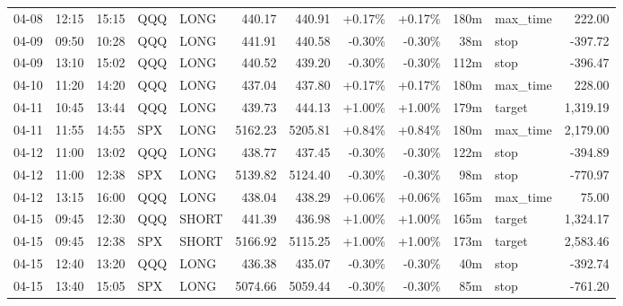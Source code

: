 \documentclass[11pt,a4paper]{article}
\begin{document}
\begin{center}
\begin{longtable}{>{\color{txtmain}}l l l l l r r r r r >{\color{txtmain}}l r}
04-08 & 12:15 & 15:15 & QQQ & LONG & 440.17 & 440.91 & \textcolor{wingreen}{+0.17\%} & \textcolor{wingreen}{+0.17\%} & 180m & max\_time & \textcolor{wingreen}{222.00} \\
04-09 & 09:50 & 10:28 & QQQ & LONG & 441.91 & 440.58 & \textcolor{lossred}{-0.30\%} & \textcolor{lossred}{-0.30\%} & 38m & stop & \textcolor{lossred}{-397.72} \\
04-09 & 13:10 & 15:02 & QQQ & LONG & 440.52 & 439.20 & \textcolor{lossred}{-0.30\%} & \textcolor{lossred}{-0.30\%} & 112m & stop & \textcolor{lossred}{-396.47} \\
04-10 & 11:20 & 14:20 & QQQ & LONG & 437.04 & 437.80 & \textcolor{wingreen}{+0.17\%} & \textcolor{wingreen}{+0.17\%} & 180m & max\_time & \textcolor{wingreen}{228.00} \\
04-11 & 10:45 & 13:44 & QQQ & LONG & 439.73 & 444.13 & \textcolor{wingreen}{+1.00\%} & \textcolor{wingreen}{+1.00\%} & 179m & target & \textcolor{wingreen}{1,319.19} \\
04-11 & 11:55 & 14:55 & SPX & LONG & 5162.23 & 5205.81 & \textcolor{wingreen}{+0.84\%} & \textcolor{wingreen}{+0.84\%} & 180m & max\_time & \textcolor{wingreen}{2,179.00} \\
04-12 & 11:00 & 13:02 & QQQ & LONG & 438.77 & 437.45 & \textcolor{lossred}{-0.30\%} & \textcolor{lossred}{-0.30\%} & 122m & stop & \textcolor{lossred}{-394.89} \\
04-12 & 11:00 & 12:38 & SPX & LONG & 5139.82 & 5124.40 & \textcolor{lossred}{-0.30\%} & \textcolor{lossred}{-0.30\%} & 98m & stop & \textcolor{lossred}{-770.97} \\
04-12 & 13:15 & 16:00 & QQQ & LONG & 438.04 & 438.29 & \textcolor{wingreen}{+0.06\%} & \textcolor{wingreen}{+0.06\%} & 165m & max\_time & \textcolor{wingreen}{75.00} \\
04-15 & 09:45 & 12:30 & QQQ & SHORT & 441.39 & 436.98 & \textcolor{wingreen}{+1.00\%} & \textcolor{wingreen}{+1.00\%} & 165m & target & \textcolor{wingreen}{1,324.17} \\
04-15 & 09:45 & 12:38 & SPX & SHORT & 5166.92 & 5115.25 & \textcolor{wingreen}{+1.00\%} & \textcolor{wingreen}{+1.00\%} & 173m & target & \textcolor{wingreen}{2,583.46} \\
04-15 & 12:40 & 13:20 & QQQ & LONG & 436.38 & 435.07 & \textcolor{lossred}{-0.30\%} & \textcolor{lossred}{-0.30\%} & 40m & stop & \textcolor{lossred}{-392.74} \\
04-15 & 13:40 & 15:05 & SPX & LONG & 5074.66 & 5059.44 & \textcolor{lossred}{-0.30\%} & \textcolor{lossred}{-0.30\%} & 85m & stop & \textcolor{lossred}{-761.20} \\

\end{longtable}
\end{center}
\end{document}
